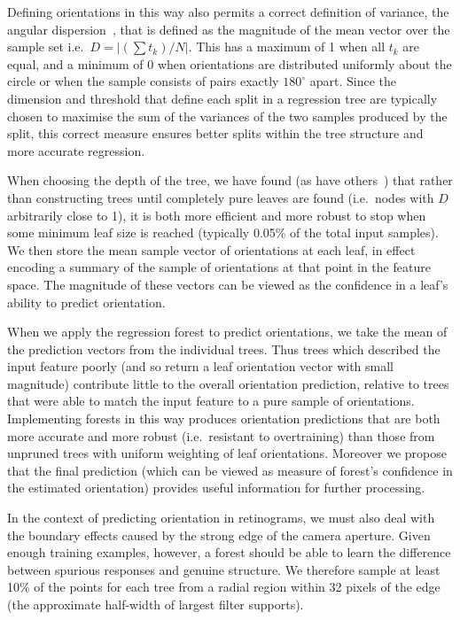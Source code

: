 \documentclass[runningheads,a4paper]{llncs}
\def\ie{i.e.}
\begin{document}
Defining orientations in this way also permits a correct definition of variance, the angular dispersion~\cite{Mardia_Jupp_00}, that is defined as the magnitude of the mean vector over the sample set \ie~$D = |(\sum{t_k})/N|$. This has a maximum of 1 when all $t_k$ are equal, and a minimum of 0 when orientations are distributed uniformly about the circle or when the sample consists of pairs exactly $180^\circ$ apart. Since the dimension and threshold that define each split in a regression tree are typically chosen to maximise the sum of the variances of the two samples produced by the split, this correct measure ensures better splits within the tree structure and more accurate regression.

When choosing the depth of the tree, we have found (as have others~\cite{Criminisi_MICCAI11}) that rather than constructing trees until completely pure leaves are found (\ie~nodes with $D$ arbitrarily close to 1), it is both more efficient and more robust to stop when some minimum leaf size is reached (typically 0.05\% of the total input samples). We then store the mean sample vector of orientations at each leaf, in effect encoding a summary of the sample of orientations at that point in the feature space. The magnitude of these vectors can be viewed as the confidence in a leaf's ability to predict orientation.

When we apply the regression forest to predict orientations, we take the mean of the prediction vectors from the individual trees. Thus trees which described the input feature poorly (and so return a leaf orientation vector with small magnitude) contribute little to the overall orientation prediction, relative to trees that were able to match the input feature to a pure sample of orientations. Implementing forests in this way produces orientation predictions that are both more accurate and more robust (\ie~resistant to overtraining) than those from unpruned trees with uniform weighting of leaf orientations. Moreover we propose that the final prediction (which can be viewed as measure of forest's confidence in the estimated orientation) provides useful information for further processing.

In the context of predicting orientation in retinograms, we must also deal with the boundary effects caused by the strong edge of the camera aperture. Given enough training examples, however, a forest should be able to learn the difference between spurious responses and genuine structure. We therefore sample at least 10\% of the points for each tree from a radial region within 32 pixels of the edge (the approximate half-width of largest filter supports).
\end{document}
